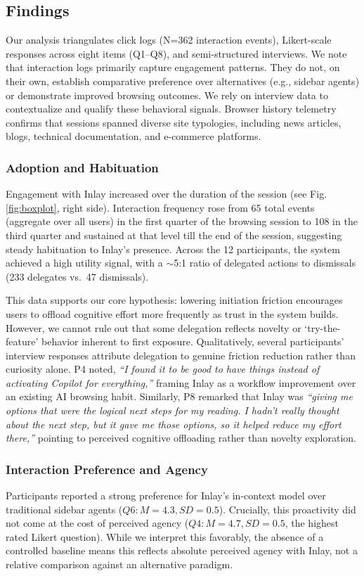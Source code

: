\documentclass[sigconf]{acmart}
\begin{document}
\subsection{Findings}

Our analysis triangulates click logs (N=362 interaction events), Likert-scale responses across eight items (Q1--Q8), and semi-structured interviews. We note that interaction logs primarily capture engagement patterns. They do not, on their own, establish comparative preference over alternatives (e.g., sidebar agents) or demonstrate improved browsing outcomes. We rely on interview data to contextualize and qualify these behavioral signals. Browser history telemetry confirms that sessions spanned diverse site typologies, including news articles, blogs, technical documentation, and e-commerce platforms.

\subsubsection{Adoption and Habituation}
Engagement with Inlay increased over the duration of the session (see Fig. \ref{fig:boxplot}, right side). Interaction frequency rose from 65 total events (aggregate over all users) in the first quarter of the browsing session to 108 in the third quarter and sustained at that level till the end of the session, suggesting steady habituation to Inlay's presence. Across the 12 participants, the system achieved a high utility signal, with a $\sim$5:1 ratio of delegated actions to dismissals (233 delegates vs.\ 47 dismissals). 

This data supports our core hypothesis: lowering initiation friction encourages users to offload cognitive effort more frequently as trust in the system builds. However, we cannot rule out that some delegation reflects novelty or `try-the-feature' behavior inherent to first exposure. Qualitatively, several participants' interview responses attribute delegation to genuine friction reduction rather than curiosity alone. P4 noted, \textit{``I found it to be good to have things instead of activating Copilot for everything,''} framing Inlay as a workflow improvement over an existing AI browsing habit. Similarly, P8 remarked that Inlay was \textit{``giving me options that were the logical next steps for my reading. I hadn't really thought about the next step, but it gave me those options, so it helped reduce my effort there,''} pointing to perceived cognitive offloading rather than novelty exploration.

\subsubsection{Interaction Preference and Agency}
Participants reported a strong preference for Inlay's in-context model over traditional sidebar agents ($Q6: M=4.3, SD=0.5$). Crucially, this proactivity did not come at the cost of perceived agency ($Q4: M=4.7, SD=0.5$, the highest rated Likert question). While we interpret this favorably, the absence of a controlled baseline means this reflects absolute perceived agency with Inlay, not a relative comparison against an alternative paradigm.
\end{document}
